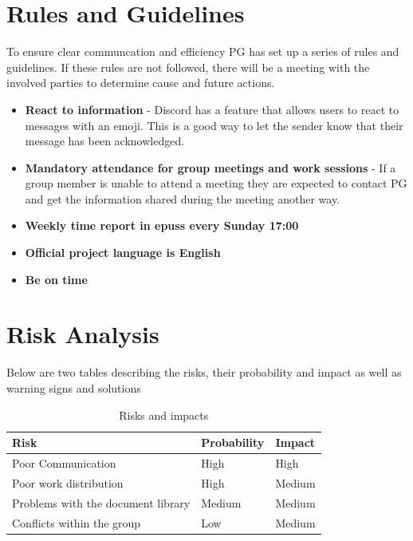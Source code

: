 \documentclass{article}
\begin{document}
\section{Rules and Guidelines} %
    To ensure clear communcation and efficiency PG has set up a series of rules and guidelines. If these rules are not followed, there will be a meeting with the involved parties to determine cause and future actions. 
    
    \begin{itemize}
        \item \textbf{React to information} - Discord has a feature that allows users to react to messages with an emoji. This is a good way to let the sender know that their message has been acknowledged.
        \item \textbf{Mandatory attendance for group meetings and work sessions} - If a group member is unable to attend a meeting they are expected to contact PG and get the information shared during the meeting another way.  
        \item \textbf{Weekly time report in epuss every Sunday 17:00}
        \item \textbf{Official project language is English}
        \item \textbf{Be on time}
    \end{itemize}

\section{Risk Analysis}
    Below are two tables describing the risks, their probability and impact as well as warning signs and solutions
    
    \begin{table}[h]
        \centering
        \begin{tabular}{|l|l|l|}
             \hline
             \textbf{Risk} 
             & \textbf{Probability}
             & \textbf{Impact} \\
             \hline
             Poor Communication 
             & High
             & High \\
             \hline
             Poor work distribution
             & High
             & Medium \\
             \hline
             Problems with the document library
             & Medium
             & Medium \\
             \hline
             Conflicts within the group
             & Low
             & Medium \\
             \hline
        \end{tabular}
        \caption{Risks and impacts}
        \label{tab:my_label}
    \end{table}
\end{document}
